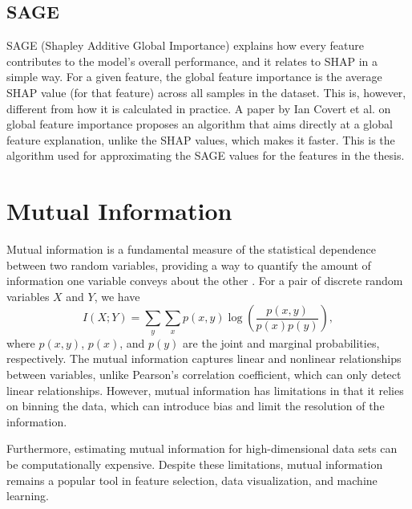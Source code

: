 \subsection{SAGE}
SAGE (Shapley Additive Global Importance) explains how every feature contributes to the model's overall performance, and it relates to SHAP in a simple way.
For a given feature, the global feature importance is the average SHAP value (for that feature) across all samples in the dataset.
This is, however, different from how it is calculated in practice.
A paper by Ian Covert et al.
\cite{sagepaper} on global feature importance proposes an algorithm that aims directly at a global feature explanation, unlike the SHAP values, which makes
it faster.
This is the algorithm used for approximating the SAGE values for the features in the thesis.

\section{Mutual Information}
Mutual information is a fundamental measure of the statistical dependence between two random variables,
providing a way to quantify the amount of information one variable conveys about the other \cite{Shannon1948}.
For a pair of discrete random variables $X$ and $Y$, we have 
\begin{equation}\label{eq:mutual_info}
    I(X;Y) = \sum_{y} \sum_{x} p(x,y) \log \left( \frac{p(x,y)}{p(x)p(y)} \right),
\end{equation}
where $p(x,y)$, $p(x)$, and $p(y)$ are the joint and marginal probabilities, respectively.
The mutual information captures linear and nonlinear relationships between variables, unlike Pearson's correlation coefficient, which can only detect linear relationships.
However, mutual information has limitations in that it relies on binning the data, which can introduce bias and limit the resolution of the information.
   
Furthermore, estimating mutual information for high-dimensional data sets can be computationally expensive.
Despite these limitations, mutual information remains a popular tool in feature selection, data visualization, and machine learning.